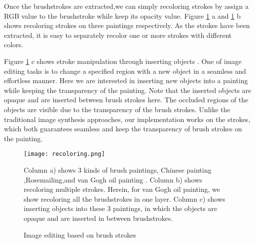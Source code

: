 Once the brushstrokes are extracted,we can simply recoloring strokes by assign a RGB value to the brushstroke while keep its opacity value.
Figure \ref{recoloring} a and \ref{recoloring} b shows recoloring strokes on three paintings respectively. As the strokes have been extracted, it is easy to separately recolor one or more strokes with different colors. 

Figure \ref{recoloring} c shows stroke manipulation through inserting objects . One of image editing tasks is to change a specified region with a new object in a seamless and effortless manner. Here we are interested in inserting new objects into a painting while keeping the transparency of the painting. Note that the inserted objects are opaque and are inserted between  brush strokes here. The occluded regions of the objects are visible due to the transparency of the brush strokes. Unlike the traditional image synthesis approaches, our implementation works on the strokes, which both guarantees seamless and keep the transparency of brush strokes on the painting.


\begin{figure}[H]
	\centering
	\texttt{[image: recoloring.png]}
	\caption{Image editing based on brush strokes}
	\label{recoloring}
	\medskip
Column a) shows 3 kinds of brush paintings, Chinese painting ,Rosemailing,and van Gogh oil painting . Column b) shows recoloring multiple strokes. Herein, for van Gogh oil painting, we show recoloring all the brushstrokes in one layer. Column c) shows inserting objects into these 3 paintings, in which the objects are opaque and are inserted in between brushstrokes.

\end{figure}

